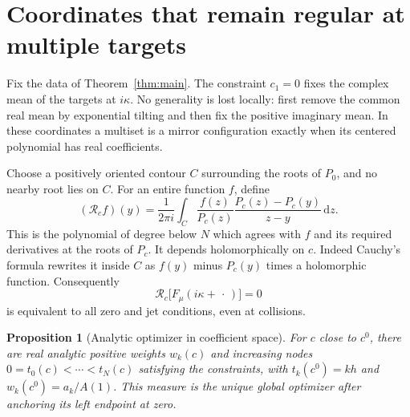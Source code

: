 \documentclass[11pt]{article}
\newtheorem{proposition}[theorem]{Proposition}
\theoremstyle{remark}\newtheorem{remark}[theorem]{Remark}
\newcommand{\dd}{\,\mathrm d}\newcommand{\supp}{\operatorname{supp}}
\begin{document}
\section{Coordinates that remain regular at multiple targets}

Fix the data of Theorem~\ref{thm:main}. The constraint $c_1=0$ fixes the
complex mean of the targets at $i\kappa$. No generality is lost locally:
first remove the common real mean by exponential tilting and then fix the
positive imaginary mean. In these coordinates a multiset is a mirror
configuration exactly when its centered polynomial has real coefficients.

Choose a positively oriented contour $C$ surrounding the roots of $P_0$,
and no nearby root lies on $C$. For an entire function $f$, define
\begin{equation}\label{eq:remainder}
 (\mathcal R_cf)(y)=\frac1{2\pi i}\int_C
 \frac{f(z)}{P_c(z)}\frac{P_c(z)-P_c(y)}{z-y}\dd z.
\end{equation}
This is the polynomial of degree below $N$ which agrees with $f$ and its
required derivatives at the roots of $P_c$. It depends holomorphically on
$c$. Indeed Cauchy's formula rewrites it inside $C$ as $f(y)$ minus
$P_c(y)$ times a holomorphic function. Consequently
\[
 \mathcal R_c\bigl[F_\mu(i\kappa+\,\cdot\,)\bigr]=0
\]
is equivalent to all zero and jet conditions, even at collisions.

\begin{proposition}[Analytic optimizer in coefficient space]
\label{prop:analytic}
For $c$ close to $c^0$, there are real analytic positive weights $w_k(c)$
and increasing nodes $0=t_0(c)<\cdots<t_N(c)$ satisfying the constraints,
with $t_k(c^0)=kh$ and $w_k(c^0)=a_k/A(1)$. This measure is the unique
global optimizer after anchoring its left endpoint at zero.
\end{proposition}
\end{document}
